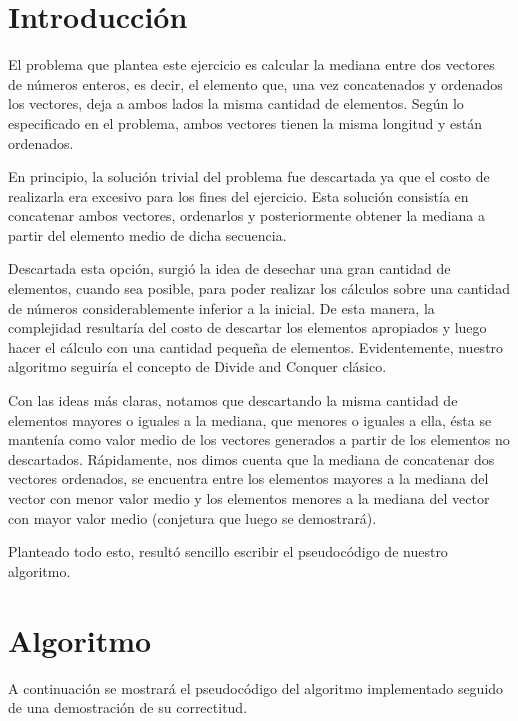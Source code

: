 \documentclass[a4paper,11pt] {article}
\begin{document}
\bigskip
\section*{Introducci\'on}

El problema que plantea este ejercicio es calcular la mediana entre dos vectores de n\'umeros enteros, es decir, el elemento que, una vez concatenados y ordenados los vectores, deja a ambos lados la misma cantidad de elementos. Seg\'un lo especificado en el problema, ambos vectores tienen la misma longitud y est\'an ordenados.

En principio, la soluci\'on trivial del problema fue descartada ya que el costo de realizarla era excesivo para los fines del ejercicio. Esta soluci\'on consist\'ia en concatenar ambos vectores, ordenarlos y posteriormente obtener la mediana a partir del elemento medio de dicha secuencia.

Descartada esta opci\'on, surgi\'o la idea de desechar una gran cantidad de elementos, cuando sea posible, para poder realizar los c\'alculos sobre una cantidad de n\'umeros considerablemente inferior a la inicial. De esta manera, la complejidad resultar\'ia del costo de descartar los elementos apropiados y luego hacer el c\'alculo con una cantidad peque\~{n}a de elementos. Evidentemente, nuestro algoritmo seguir\'ia el concepto de Divide and Conquer cl\'asico.

Con las ideas m\'as claras, notamos que descartando la misma cantidad de elementos mayores o iguales a la mediana, que menores o iguales a ella, \'esta se manten\'ia como valor medio de los vectores generados a partir de los elementos no descartados. R\'apidamente, nos dimos cuenta que la mediana de concatenar dos vectores ordenados, se encuentra entre los elementos mayores a la mediana del vector con menor valor medio y los elementos menores a la mediana del vector con mayor valor medio (conjetura que luego se demostrar\'a).

Planteado todo esto, result\'o sencillo escribir el pseudoc\'odigo de nuestro algoritmo. 

\section*{Algoritmo}

A continuaci\'on se mostrar\'a el pseudoc\'odigo del algoritmo implementado seguido de una demostraci\'on de su correctitud.
\end{document}
